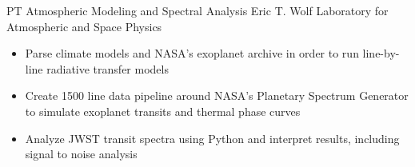 {PT} %
{Atmospheric Modeling and Spectral Analysis} %
{Eric T. Wolf} %
{Laboratory for Atmospheric and Space Physics}
{\begin{itemize}
\setlength\itemsep{0.1em}
\item Parse climate models and NASA's exoplanet archive in order to run line-by-line radiative transfer models
\item Create 1500 line data pipeline around NASA's Planetary Spectrum Generator to simulate exoplanet transits and thermal phase curves
\item Analyze JWST transit spectra using Python and interpret results, including signal to noise analysis
\end{itemize}
}
